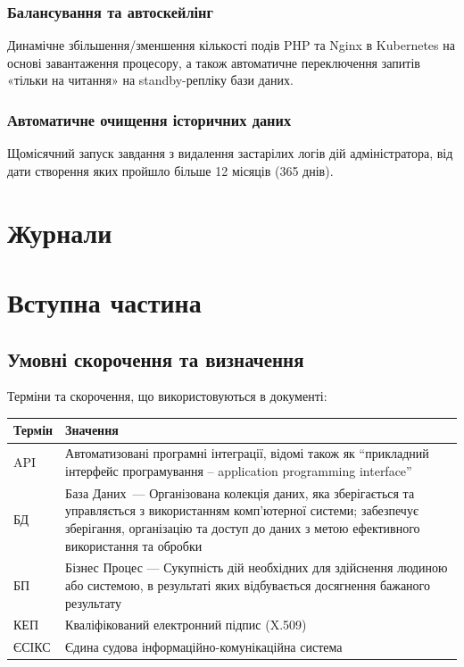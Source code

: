 \documentclass{article}
\begin{document}
\subsubsection{Балансування та автоскейлінг}
Динамічне збільшення/зменшення кількості подів PHP та Nginx в Kubernetes на основі завантаження процесору, а також автоматичне переключення запитів «тільки на читання» на standby-репліку бази даних.

\subsubsection{Автоматичне очищення історичних даних}
Щомісячний запуск завдання з видалення застарілих логів дій адміністратора, від дати створення яких пройшло більше 12 місяців (365 днів).

\section{Журнали}

\newpage
\section*{Вступна частина}

\subsection*{Умовні скорочення та визначення}

Терміни та скорочення, що використовуються в документі:

\begin{longtable}{p{4cm}p{10cm}}
\toprule
\textbf{Термін} & \textbf{Значення} \\
\midrule
API & Автоматизовані програмні інтеграції, відомі також як “прикладний інтерфейс програмування – application programming interface” \\
БД & База Даних — Організована колекція даних, яка зберігається та управляється з використанням комп'ютерної системи; забезпечує зберігання, організацію та доступ до даних з метою ефективного використання та обробки \\
БП & Бізнес Процес — Сукупність дій необхідних для здійснення людиною або системою, в результаті яких відбувається досягнення бажаного результату \\
КЕП & Кваліфікований електронний підпис (X.509) \\
ЄСІКС & Єдина судова інформаційно-комунікаційна система \\
\bottomrule
\end{longtable}
\end{document}
